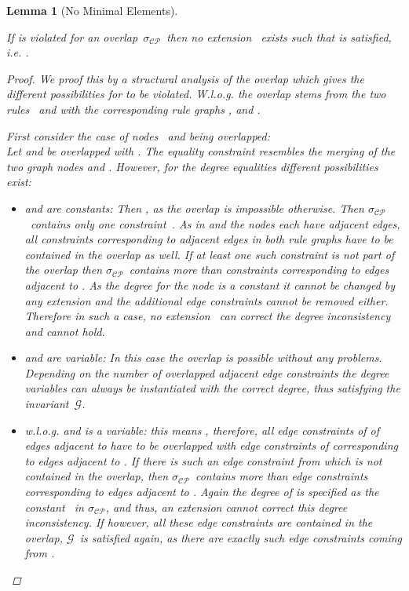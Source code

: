 \documentclass{tlp}
\newtheorem{lemma}[theorem]{Lemma}
\newcommand{\mcCP}{\ensuremath{\mathcal{CP}}}
\newcommand{\mcG}{\ensuremath{\mathcal{G}}}
\newcommand{\sigcp}{\ensuremath{\sigma_{\mcCP}}}
\begin{document}
\begin{lemma}[No Minimal Elements]\label{lem:obs_confl_empty_M}

If  is violated for an overlap~\sigcp\ then no extension~
exists such that  is satisfied, i.e.
.

\begin{proof}
We proof this by a structural analysis of the overlap which gives the different
possibilities for  to be violated. W.l.o.g.
the overlap stems from the two rules~ and  with the corresponding rule graphs
, and .

First consider the case of nodes~ and  being overlapped:\\
Let  and
 be overlapped with
. The equality constraint  resembles the merging of the two graph nodes  and
. However, for the degree equalities different possibilities exist:

\begin{itemize}

  \item  and  are constants: Then , as the overlap is impossible otherwise. Then \sigcp\
  contains only one constraint~. As
  in  and  the nodes each have  adjacent edges, all constraints
  corresponding to adjacent edges in both rule graphs have to be contained in the
  overlap as well. If at least one such constraint is not part of the overlap
  then \sigcp\ contains more than  constraints corresponding to edges adjacent
  to . As the degree for the node is a constant it cannot be changed
  by any extension and the additional edge constraints cannot be removed either.
  Therefore in such a case, no extension~ can correct the degree
  inconsistency and  cannot hold.

  \item  and  are variable: In this case the overlap is possible
  without any problems. Depending on the number of overlapped adjacent edge
  constraints the degree variables can always be instantiated with the correct
  degree, thus satisfying the invariant~\mcG.

  \item w.l.o.g.  and  is a variable: this means , therefore, all edge constraints of  of edges adjacent to
   have to be overlapped with edge constraints of  corresponding to
  edges adjacent to . If there is such an edge constraint from 
  which is not contained in the overlap, then \sigcp\ contains more than  edge
  constraints corresponding to edges adjacent to . Again the degree of 
  is specified as the constant~ in \sigcp, and thus, an extension cannot
  correct this degree inconsistency. If however, all these edge constraints are
  contained in the overlap, \mcG\ is satisfied again, as there are exactly 
  such edge constraints coming from .
\end{itemize}


\end{proof}
\end{lemma}
\end{document}
